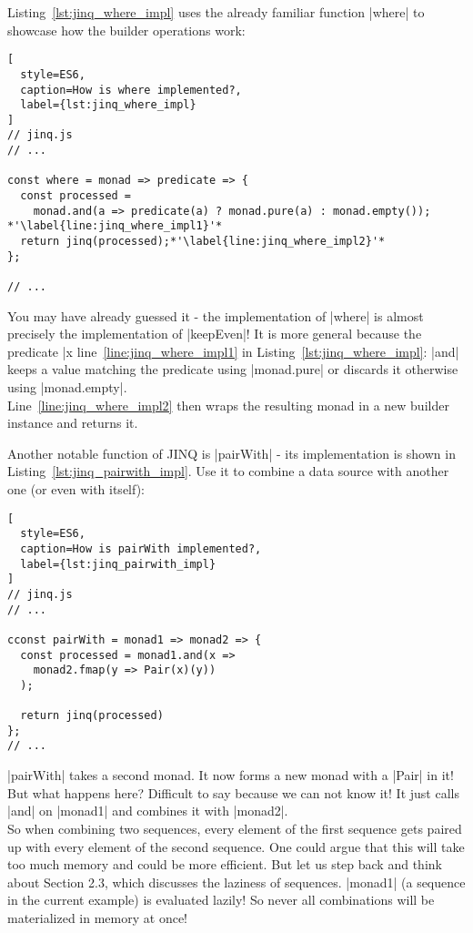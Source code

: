 Listing~\ref{lst:jinq_where_impl} uses the already familiar function |where| to
showcase how the builder operations work:

\begin{lstlisting}[
  style=ES6,
  caption=How is where implemented?,
  label={lst:jinq_where_impl}
]
// jinq.js
// ...

const where = monad => predicate => {
  const processed = 
    monad.and(a => predicate(a) ? monad.pure(a) : monad.empty()); *'\label{line:jinq_where_impl1}'*
  return jinq(processed);*'\label{line:jinq_where_impl2}'*
};

// ...
\end{lstlisting}

You may have already guessed it - the implementation of |where| is almost
precisely the implementation of |keepEven|! It is more general because the
predicate |x %
line~\ref{line:jinq_where_impl1} in Listing~\ref{lst:jinq_where_impl}: |and|
keeps a value matching the predicate using |monad.pure| or discards it
otherwise using |monad.empty|.\\
Line~\ref{line:jinq_where_impl2} then wraps the resulting monad in a new
builder instance and returns it.

Another notable function of JINQ is |pairWith| - its implementation is shown in
Listing~\ref{lst:jinq_pairwith_impl}. Use it to combine a data source with
another one (or even with itself):

\begin{lstlisting}[
  style=ES6,
  caption=How is pairWith implemented?,
  label={lst:jinq_pairwith_impl}
]
// jinq.js
// ...

cconst pairWith = monad1 => monad2 => {
  const processed = monad1.and(x =>
    monad2.fmap(y => Pair(x)(y))
  );

  return jinq(processed)
};
// ...
\end{lstlisting}

|pairWith| takes a second monad. It now forms a new monad with a |Pair| in it!
But what happens here? Difficult to say because we can not know it! It just
calls |and| on |monad1| and combines it with |monad2|. \\
So when combining two sequences, every element of the first sequence gets
paired up with every element of the second sequence. One could argue that this
will take too much memory and could be more efficient. But let us step back and
think about Section 2.3, which discusses the laziness of sequences. |monad1|
(a sequence in the current example) is evaluated lazily! So never all
combinations will be materialized in memory at once!


